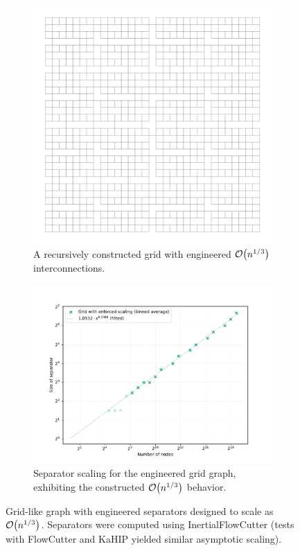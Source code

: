 \begin{figure}[tbhp]
	\centering
	\begin{subfigure}[t]{0.38\linewidth}
		\centering
		\includegraphics[width=\linewidth]{graphics/cbrt_grid.png}
		\caption{A recursively constructed grid with engineered \(\mathcal{O}\!\left(n^{1/3}\right)\) interconnections.}
		\label{fig:engineered_grid_structure_viz}
	\end{subfigure}
	\hfill
	\begin{subfigure}[t]{0.55\linewidth}
		\centering
		\includegraphics[width=\linewidth]{graphics/cbrt_grid_sep_scaling.pdf}
		\caption{Separator scaling for the engineered grid graph, exhibiting the constructed \(\mathcal{O}\!\left(n^{1/3}\right)\) behavior.}
		\label{fig:engineered_grid_sep_plot}
	\end{subfigure}
	\caption{Grid-like graph with engineered separators designed to scale as \(\mathcal{O}\!\left(n^{1/3}\right)\). Separators were computed using InertialFlowCutter (tests with FlowCutter and KaHIP yielded similar asymptotic scaling).}
	\label{fig:engineered_grid_sep}
\end{figure}
